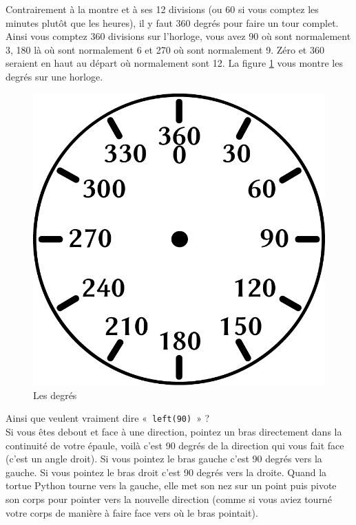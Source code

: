 Contrairement à la montre et à ses 12 divisions (ou 60 si vous comptez les minutes plutôt que les heures), il y faut 360 degrés pour faire un tour complet. Ainsi vous comptez 360 divisions sur l'horloge, vous avez 90 où sont normalement 3, 180 là où sont normalement 6 et 270 où sont normalement 9. Zéro et 360 seraient en haut au départ où normalement   sont 12. La figure \ref{fig:degres} vous montre les degrés sur une horloge.
\begin{figure}[H]
\centering
\includegraphics[scale=0.5]{images/degres.pdf}
\caption{Les degrés}
\label{fig:degres}
\end{figure}

Ainsi que veulent vraiment dire «~\texttt{left(90)}~»  ?\\

Si vous êtes debout et face à une direction, pointez un bras directement dans la continuité de votre épaule, voilà c'est 90 degrés de la direction qui vous fait face (c'est un angle droit). Si vous pointez le bras gauche c'est 90 degrés vers la gauche. Si vous pointez le bras droit c'est 90 degrés vers la droite. Quand la tortue Python tourne vers la gauche, elle met son nez sur un point puis pivote son corps pour pointer vers la nouvelle direction (comme si vous aviez tourné votre corps de manière à faire face vers où le bras pointait).\\

